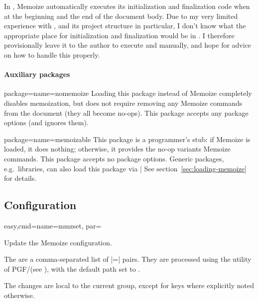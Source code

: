\documentclass[a4paper,11pt]{article}
\begin{document}
In , Memoize automatically executes its initialization and
finalization code when at the beginning and the end of the document body.  Due
to my very limited experience with , and its project structure
in particular, I don't know what the appropriate place for initialization and
finalization would be in .  I therefore provisionally leave it
to the author to execute  and
 manually, and hope for advice
on how to handle this properly.


\paragraph{Auxiliary packages}

\begin{doc}{package={name=nomemoize}}
  Loading this package instead of Memoize completely disables memoization, but
  does not require removing any Memoize commands from the document (they all
  become no-ops).  This package accepts any package options (and ignores them).
\end{doc}

\begin{doc}{package={name=memoizable}}
  This package is a programmer's stub: if Memoize is loaded, it does nothing;
  otherwise, it provides the no-op variants Memoize commands.  This package
  accepts no package options.  Generic packages, e.g.\ \TikZ libraries, can
  also load this package via |  See
  section~\ref{sec:loading-memoize} for details.
\end{doc}


\subsection{Configuration}
\label{sec:ref:configuration}


\begin{doc}{easy,cmd={name=mmzset, par=}}
  
  Update the Memoize configuration.

  The  are a comma-separated list of |=|
  pairs.  They are processed using the  utility of PGF/\TikZ (see
  ), with the default path set to .

  The changes are local to the current  group, except for keys
  where explicitly noted otherwise.
\end{doc}
\end{document}
